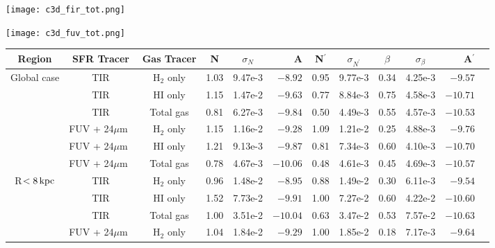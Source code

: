 \documentclass[useAMS,usenatbib]{mn2e}
\newcommand \kpc        {\,{\rm kpc}}
\newcommand \um    {$\mu$m\ }
\newcommand \nprime {N$^\prime$}
\newcommand \eqnprime {N^\prime}
\begin{document}
\begin{figure*}
\centering
\texttt{[image: c3d\_fir\_tot.png]}
\caption{Fitting result from the SFR(TIR) vs total gas.}
\label{fig:es,regs,fir,tot}
\end{figure*}

\begin{figure*}
\centering
\texttt{[image: c3d\_fuv\_tot.png]}
\caption{Fitting result from the SFR(FUV + 24 $\mu$m) vs total gas.}
\label{fig:es,regs,fuv,tot}
\end{figure*}




\begin{table*}
\caption{Fitting parameters of the SF laws from applying the Bayesian.}
\label{table:res}
\begin{tabular}{cccccrccccrr}
\hline\hline
\multicolumn{1}{c}{\multirow{1}{*}{Region}} & SFR Tracer& Gas Tracer & N & $\sigma_N$ & A & \nprime & $\sigma_{\eqnprime}$ & $\beta$ & $\sigma_\beta$ & A$^\prime$& \\
\hline
\multicolumn{1}{c}{\multirow{6}{*}{Global case}} & TIR & H$_2$ only & 1.03 & 9.47e-3  & $-8.92$  & 0.95 & 9.77e-3 & 0.34 & 4.25e-3 & $-9.57$  \\
 & TIR         & HI only    & 1.15 & 1.47e-2 & $-9.63$  & 0.77 & 8.84e-3 & 0.75 & 4.58e-3 & $-10.71$ \\
 & TIR         & Total gas  & 0.81 & 6.27e-3 & $-9.84$  & 0.50 & 4.49e-3 & 0.55 & 4.57e-3 & $-10.53$\\
 & FUV + 24\um & H$_2$ only & 1.15 & 1.16e-2 & $-9.28$  & 1.09 & 1.21e-2 & 0.25 & 4.88e-3 & $-9.76$  \\
 & FUV + 24\um & HI only    & 1.21 & 9.13e-3 & $-9.87$  & 0.81 & 7.34e-3 & 0.60 & 4.10e-3 & $-10.70$ \\
 & FUV + 24\um & Total gas  & 0.78 & 4.67e-3 & $-10.06$ & 0.48 & 4.61e-3 & 0.45 & 4.69e-3 & $-10.57$ \\
\hline
\multicolumn{1}{c}{\multirow{6}{*}{R$< 8\kpc$}}& TIR & H$_2$ only & 0.96 & 1.48e-2 & $-8.95$  & 0.88 & 1.49e-2 & 0.30 & 6.11e-3 & $-9.54$  \\
 & TIR         & HI only    & 1.52 & 7.73e-2  & $-9.91$ & 1.00 & 7.27e-2  & 0.60 & 4.22e-2  & $-10.60$ \\
 & TIR         & Total gas  & 1.00 & 3.51e-2  & $-10.04$ & 0.63 & 3.47e-2  & 0.53 & 7.57e-2  & $-10.63$ \\
 & FUV + 24\um & H$_2$ only & 1.04 & 1.84e-2 & $-9.29$  & 1.00 & 1.85e-2 & 0.18 & 7.17e-3 & $-9.64$  \\

\end{tabular}
\end{table*}
\end{document}
